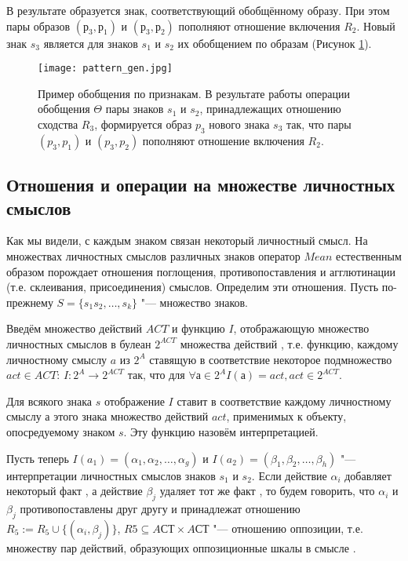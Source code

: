 В результате образуется знак, соответствующий обобщённому образу. При этом пары образов $(р_3,р_1)$ и $(р_3,р_2)$ пополняют отношение включения $R_2$. Новый знак $s_3$ является для знаков $s_1$ и $s_2$ их обобщением по образам (Рисунок \ref{fg:pattern_gen}).

\begin{figure}[h]
	\centering
	\texttt{[image: pattern\_gen.jpg]}
	\caption{Пример обобщения по признакам. В результате работы операции обобщения $\Theta$ пары знаков $s_1$ и $s_2$, принадлежащих отношению сходства $R_3$, формируется образ $p_3$ нового знака $s_3$ так, что пары $(p_3, p_1)$ и $(p_3, p_2)$ пополняют отношение включения $R_2$.}
	\label{fg:pattern_gen}
\end{figure}

\subsection{Отношения и операции на множестве личностных смыслов}

Как мы видели, с каждым знаком связан некоторый личностный смысл. На множествах личностных смыслов различных знаков оператор $Mean$ естественным образом порождает отношения поглощения, противопоставления и агглютинации (т.е. склеивания, присоединения) смыслов. Определим эти отношения. Пусть по-прежнему $S=\{s_1 s_2,\dots,s_k\}$ "--- множество знаков.

Введём множество действий $ACT$ и функцию $I$, отображающую множество личностных смыслов в булеан $2^{ACT}$ множества действий \cite{Osipov2000}, т.е. функцию, каждому личностному смыслу $a$ из $2^A$ ставящую в соответствие некоторое подмножество $act\in ACT$: $I:2^A\rightarrow 2^{ACT}$ так, что для $\forall а\in 2^A I(а)=act,act\in 2^{ACT}$.

Для всякого знака $s$ отображение $I$ ставит в соответствие каждому личностному смыслу $а$ этого знака множество действий $act$, применимых к объекту, опосредуемому знаком $s$. Эту функцию назовём интерпретацией.

Пусть теперь $I(a_1)=(\alpha_1,\alpha_2,\dots,\alpha_g)$ и $I(a_2)=(\beta_1,\beta_2,\dots,\beta_h)$ "--- интерпретации личностных смыслов знаков $s_1$ и $s_2$. Если действие $\alpha_i$ добавляет некоторый факт \cite{Osipov2000}, а действие $\beta_j$ удаляет тот же факт \cite{Osipov2000}, то будем говорить, что $\alpha_i$ и $\beta_j$ противопоставлены друг другу и принадлежат отношению $R_5:=R_5\cup\{(\alpha_i,\beta_j)\}$, $R5\subseteq AСТ\times AСТ$ "--- отношению оппозиции, т.е. множеству пар действий, образующих оппозиционные шкалы в смысле \cite{Kelly1991}.

